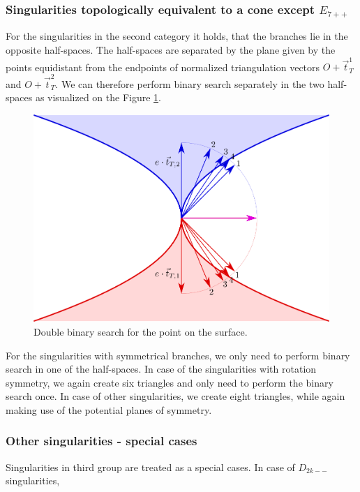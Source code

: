 \subsubsection*{Singularities topologically equivalent to a cone except $E_{7++}$}
For the singularities in the second category it holds, that the branches lie in 
the opposite half-spaces. The half-spaces are separated by the plane given by
the points equidistant from the endpoints of normalized triangulation vectors
$O+\vec{t}_T^1$ and $O+\vec{t}_T^2$. We can therefore perform binary search
separately in the two half-spaces as visualized on the Figure \ref{img:45}.

\begin{figure}
    \centerline{\includegraphics[scale=0.5]{images/img45}}
    \caption[Double binary search for the point on the surface]
    {Double binary search for the point on the surface.}
    \label{img:45}
\end{figure}

For the singularities with symmetrical branches, we only need to perform binary
search in one of the half-spaces. In case of the singularities with rotation
symmetry, we again create six triangles and only need to perform the binary search once.
In case of other singularities, we create eight triangles, while again making use of the
potential planes of symmetry.

\subsubsection*{Other singularities - special cases} 
Singularities in third group are treated as a special cases.
In case of $D_{2k--}$ singularities, 


